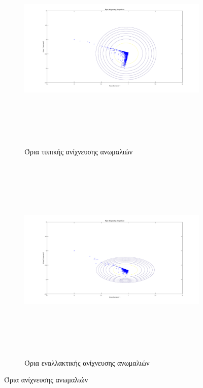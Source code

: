 \begin{figure}
\begin{subfigure}[b]{0.4\textwidth}
\includegraphics[width=160mm, height=100mm]{../../plots/gr_threshold_semi_sup_1.png}
\caption{Όρια τυπικής ανίχνευσης ανωμαλιών}
\label{fig:threshanomalydetection1}
\end{subfigure}

\begin{subfigure}[b]{0.4\textwidth}
\includegraphics[width=160mm, height=100mm]{../../plots/gr_threshold_semi_sup_2.png}
\caption{Όρια εναλλακτικής ανίχνευσης ανωμαλιών}
\label{fig:threshanomalydetection2}
\end{subfigure}

\caption{Όρια ανίχνευσης ανωμαλιών}
\label{fig:viewandthreshold}
\end{figure}


